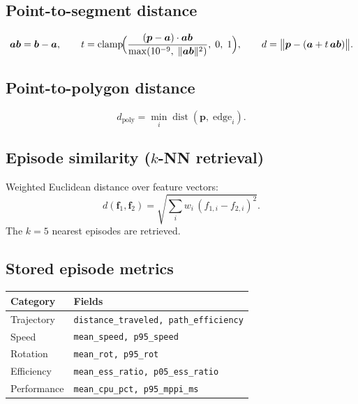 \documentclass[a4paper, 11pt]{article}
\newcommand{\vect}[1]{\bm{#1}}
\begin{document}
\subsection{Point-to-segment distance}

\begin{equation}
  \vect{ab} = \vect{b} - \vect{a},
  \qquad
  t = \operatorname{clamp}\!\Bigl(
    \frac{(\vect{p} - \vect{a}) \cdot \vect{ab}}
         {\max(10^{-9},\;\|\vect{ab}\|^2)},\; 0,\; 1
  \Bigr),
  \qquad
  d = \bigl\|\vect{p} - (\vect{a} + t\,\vect{ab})\bigr\|.
\end{equation}

\subsection{Point-to-polygon distance}

\begin{equation}
  d_{\text{poly}}
  = \min_i \operatorname{dist}(\vect{p},\; \text{edge}_i).
\end{equation}

\subsection{Episode similarity ($k$-NN retrieval)}

Weighted Euclidean distance over feature vectors:
\begin{equation}
  d(\vect{f}_1, \vect{f}_2)
  = \sqrt{\sum_i w_i\,(f_{1,i} - f_{2,i})^2}.
\end{equation}
The $k = 5$ nearest episodes are retrieved.

\subsection{Stored episode metrics}

\begin{center}
\begin{tabular}{ll}
  \toprule
  Category & Fields \\
  \midrule
  Trajectory    & \texttt{distance\_traveled, path\_efficiency} \\
  Speed         & \texttt{mean\_speed, p95\_speed} \\
  Rotation      & \texttt{mean\_rot, p95\_rot} \\
  Efficiency    & \texttt{mean\_ess\_ratio, p05\_ess\_ratio} \\
  Performance   & \texttt{mean\_cpu\_pct, p95\_mppi\_ms} \\
  \bottomrule
\end{tabular}
\end{center}
\end{document}
